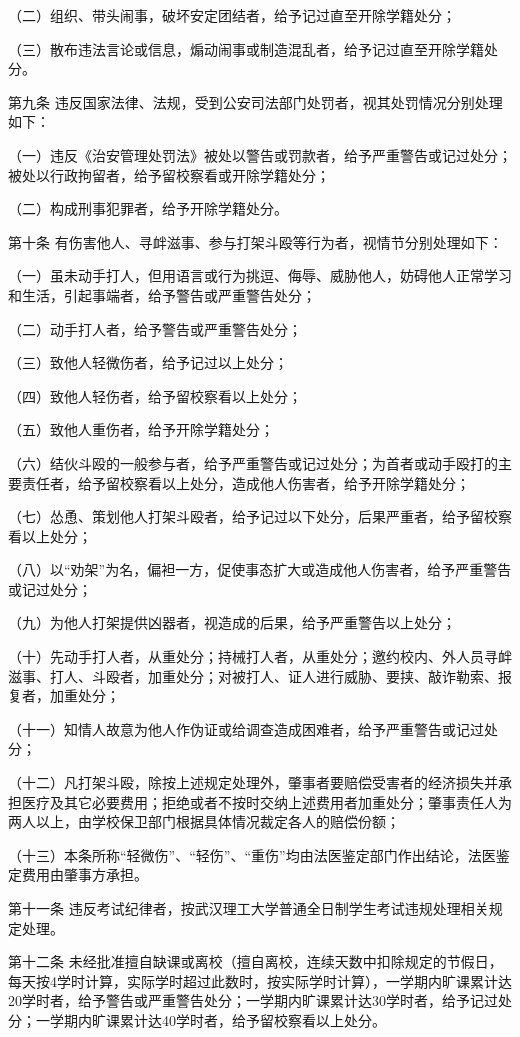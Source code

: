 \documentclass[UTF8,12pt,a4paper]{report}
\begin{document}
（二）组织、带头闹事，破坏安定团结者，给予记过直至开除学籍处分；

（三）散布违法言论或信息，煽动闹事或制造混乱者，给予记过直至开除学籍处分。

第九条  违反国家法律、法规，受到公安司法部门处罚者，视其处罚情况分别处理如下：

（一）违反《治安管理处罚法》被处以警告或罚款者，给予严重警告或记过处分；被处以行政拘留者，给予留校察看或开除学籍处分；

（二）构成刑事犯罪者，给予开除学籍处分。

第十条  有伤害他人、寻衅滋事、参与打架斗殴等行为者，视情节分别处理如下：

（一）虽未动手打人，但用语言或行为挑逗、侮辱、威胁他人，妨碍他人正常学习和生活，引起事端者，给予警告或严重警告处分；

（二）动手打人者，给予警告或严重警告处分；

（三）致他人轻微伤者，给予记过以上处分；

（四）致他人轻伤者，给予留校察看以上处分；

（五）致他人重伤者，给予开除学籍处分；

（六）结伙斗殴的一般参与者，给予严重警告或记过处分；为首者或动手殴打的主要责任者，给予留校察看以上处分，造成他人伤害者，给予开除学籍处分；

（七）怂恿、策划他人打架斗殴者，给予记过以下处分，后果严重者，给予留校察看以上处分；

（八）以“劝架”为名，偏袒一方，促使事态扩大或造成他人伤害者，给予严重警告或记过处分；

（九）为他人打架提供凶器者，视造成的后果，给予严重警告以上处分；

（十）先动手打人者，从重处分；持械打人者，从重处分；邀约校内、外人员寻衅滋事、打人、斗殴者，加重处分；对被打人、证人进行威胁、要挟、敲诈勒索、报复者，加重处分；

（十一）知情人故意为他人作伪证或给调查造成困难者，给予严重警告或记过处分；

（十二）凡打架斗殴，除按上述规定处理外，肇事者要赔偿受害者的经济损失并承担医疗及其它必要费用；拒绝或者不按时交纳上述费用者加重处分；肇事责任人为两人以上，由学校保卫部门根据具体情况裁定各人的赔偿份额；

（十三）本条所称“轻微伤”、“轻伤”、“重伤”均由法医鉴定部门作出结论，法医鉴定费用由肇事方承担。

第十一条  违反考试纪律者，按武汉理工大学普通全日制学生考试违规处理相关规定处理。

第十二条  未经批准擅自缺课或离校（擅自离校，连续天数中扣除规定的节假日，每天按4学时计算，实际学时超过此数时，按实际学时计算），一学期内旷课累计达20学时者，给予警告或严重警告处分；一学期内旷课累计达30学时者，给予记过处分；一学期内旷课累计达40学时者，给予留校察看以上处分。
\end{document}
